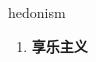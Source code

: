 
\begin{frame}
{\huge hedonism}
\begin{center}
\begin{enumerate}\Large
  \item \textbf{享乐主义}
\end{enumerate}
\end{center}
\end{frame}
